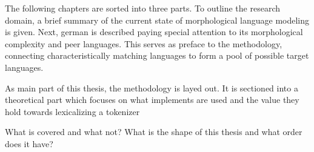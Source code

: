The following chapters are sorted into three parts.
To outline the research domain, a brief summary of the current state of morphological language modeling is given.
Next, german is described paying special attention to its morphological complexity and peer languages.
This serves as preface to the methodology, connecting characteristically matching languages to form a pool of possible  target languages.

As main part of this thesis, the methodology is layed out.
It is sectioned into a theoretical part which focuses on what implements are used and the value they hold towards lexicalizing a tokenizer

What is covered and what not?
What is the shape of this thesis and what order does it have?
